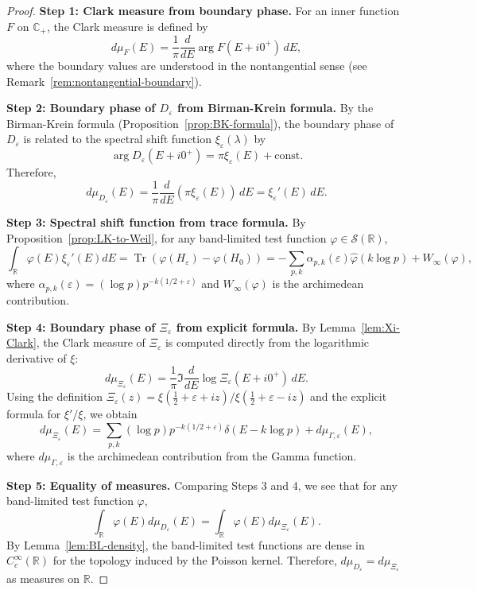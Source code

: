 ﻿\documentclass[12pt,a4paper]{article}
\theoremstyle{definition}
\theoremstyle{remark}
\newcommand{\CC}{\mathbb{C}}
\newcommand{\RR}{\mathbb{R}}
\newcommand{\Tr}{\operatorname{Tr}}
\begin{document}
\begin{proof}
\textbf{Step 1: Clark measure from boundary phase.}
For an inner function $F$ on $\CC_+$, the Clark measure is defined by
\[
  d\mu_F(E) = \frac{1}{\pi} \frac{d}{dE} \arg F(E + i0^+) \, dE,
\]
where the boundary values are understood in the nontangential sense (see Remark~\ref{rem:nontangential-boundary}).

\textbf{Step 2: Boundary phase of $D_\varepsilon$ from Birman-Krein formula.}
By the Birman-Krein formula (Proposition~\ref{prop:BK-formula}), the boundary phase of $D_\varepsilon$ is related to the spectral shift function $\xi_\varepsilon(\lambda)$ by
\[
  \arg D_\varepsilon(E + i0^+) = \pi \xi_\varepsilon(E) + \text{const}.
\]
Therefore,
\[
  d\mu_{D_\varepsilon}(E) = \frac{1}{\pi} \frac{d}{dE} (\pi \xi_\varepsilon(E)) \, dE = \xi_\varepsilon'(E) \, dE.
\]

\textbf{Step 3: Spectral shift function from trace formula.}
By Proposition~\ref{prop:LK-to-Weil}, for any band-limited test function $\varphi \in \mathcal{S}(\RR)$,
\[
  \int_\RR \varphi(E) \xi_\varepsilon'(E) dE = \Tr(\varphi(H_\varepsilon) - \varphi(H_0)) = -\sum_{p,k} \alpha_{p,k}(\varepsilon) \widehat{\varphi}(k\log p) + W_\infty(\varphi),
\]
where $\alpha_{p,k}(\varepsilon) = (\log p) p^{-k(1/2+\varepsilon)}$ and $W_\infty(\varphi)$ is the archimedean contribution.

\textbf{Step 4: Boundary phase of $\Xi_\varepsilon$ from explicit formula.}
By Lemma~\ref{lem:Xi-Clark}, the Clark measure of $\Xi_\varepsilon$ is computed directly from the logarithmic derivative of $\xi$:
\[
  d\mu_{\Xi_\varepsilon}(E) = \frac{1}{\pi} \Im \frac{d}{dE} \log \Xi_\varepsilon(E + i0^+) \, dE.
\]
Using the definition $\Xi_\varepsilon(z) = \xi(\tfrac12+\varepsilon+iz)/\xi(\tfrac12+\varepsilon-iz)$ and the explicit formula for $\xi'/\xi$, we obtain
\[
  d\mu_{\Xi_\varepsilon}(E) = \sum_{p,k} (\log p) p^{-k(1/2+\varepsilon)} \delta(E - k\log p) + d\mu_{\Gamma,\varepsilon}(E),
\]
where $d\mu_{\Gamma,\varepsilon}$ is the archimedean contribution from the Gamma function.

\textbf{Step 5: Equality of measures.}
Comparing Steps 3 and 4, we see that for any band-limited test function $\varphi$,
\[
  \int_\RR \varphi(E) d\mu_{D_\varepsilon}(E) = \int_\RR \varphi(E) d\mu_{\Xi_\varepsilon}(E).
\]
By Lemma~\ref{lem:BL-density}, the band-limited test functions are dense in $C_c^\infty(\RR)$ for the topology induced by the Poisson kernel. Therefore, $d\mu_{D_\varepsilon} = d\mu_{\Xi_\varepsilon}$ as measures on $\RR$.
\end{proof}
\end{document}
